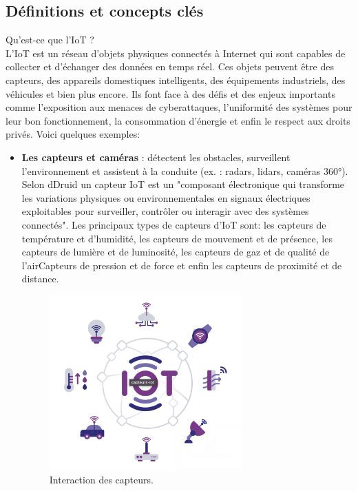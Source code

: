 \subsection{Définitions et concepts clés}
Qu'est-ce que l'IoT ?\\
L'IoT est un réseau d’objets physiques connectés à Internet qui sont capables de collecter et d’échanger des données en temps réel. Ces objets peuvent être des capteurs, des appareils domestiques intelligents, des équipements industriels, des véhicules et bien plus encore. Ils font face à des défis et des enjeux importants comme l'exposition aux menaces de cyberattaques, l'uniformité des systèmes pour leur bon fonctionnement, la consommation d'énergie et enfin le respect aux droits privés. Voici quelques exemples:
\begin{itemize}
    \item \textbf{Les capteurs et caméras} : détectent les obstacles, surveillent l’environnement et assistent à la conduite (ex. : radars, lidars, caméras 360°). Selon dDruid\cite{capteur} un capteur IoT est un "composant électronique qui transforme les variations physiques ou environnementales en signaux électriques exploitables pour surveiller, contrôler ou interagir avec des systèmes connectés".
    Les principaux types de capteurs d'IoT sont: les capteurs de température et d'humidité, les capteurs de mouvement et de présence, les capteurs de lumière et de luminosité, les capteurs de gaz et de qualité de l’airCapteurs de pression et de force et enfin les capteurs de proximité et de distance.
    \begin{figure}[H]
        \centering
        \includegraphics[width=0.7\textwidth]{images/capteur.png} 
        \caption{Interaction des capteurs.}
    \end{figure}

\end{itemize}
